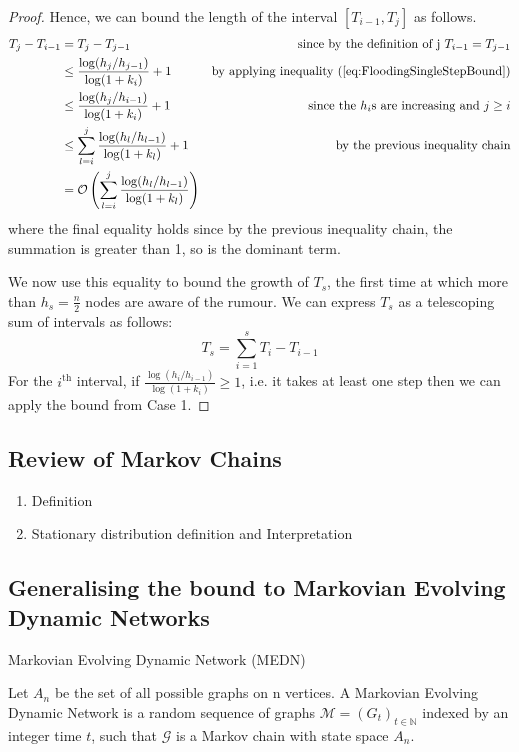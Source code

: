 \begin{proof}
	Hence, we can bound the length of the interval $[T_{i-1}, T_j]$ as follows.
	\begin{align*}
		T_j - T_{i-1} &= T_j - T_{j-1} & \text{since by the definition of j } T_{i-1} = T_{j-1}\\
		& \leq \frac{\log (h_j/h_{j-1})}{\log(1+k_i)} + 1 & \text{by applying inequality }(\ref{eq:FloodingSingleStepBound}) \\
		& \leq \frac{\log (h_j/h_{i-1})}{\log(1+k_i)} + 1 & \text{since the } h_i \text{s are increasing and } j \geq i \\
		& \leq \sum_{l=i}^j \frac{\log (h_{l}/h_{l-1})}{\log(1+k_l) } + 1 & \text{ by the previous inequality chain} \\
		& = \mathcal{O}\left(\sum_{l=i}^j \frac{\log (h_{l}/h_{l-1})}{\log(1+k_l) }\right)
 	\end{align*}
	where the final equality holds since by the previous inequality chain, the summation is greater than 1, so is the dominant term.

	We now use this equality to bound the growth of $T_s$, the first time at which more than $h_s = \frac{n}{2}$ nodes are aware of the rumour. We can express $T_s$ as a telescoping sum of intervals as follows:
	$$
		T_s = \sum_{i=1}^s T_i - T_{i-1}
	$$
	For the $i^\text{th}$ interval, if $\frac{\log (h_i/h_{i-1})}{\log(1+k_i)} \geq 1$, i.e. it takes at least one step then we can apply the bound from Case 1.
	
\end{proof}

\subsection{Review of Markov Chains}

\begin{enumerate}
	\item Definition
	\item Stationary distribution definition and Interpretation
\end{enumerate}

\subsection{Generalising the bound to Markovian Evolving Dynamic Networks}
\label{subsection:MEDNBound}

\begin{definition}
	Markovian Evolving Dynamic Network (MEDN)

	\noindent 
	Let $A_n$ be the set of all possible graphs on n vertices.
	A Markovian Evolving Dynamic Network is a random sequence of graphs $\mathcal{M} = (G_t)_{t \in \mathbb{N}}$ indexed by an integer time $t$, such that $\mathcal{G}$ is a Markov chain with state space $A_n$.
\end{definition}

